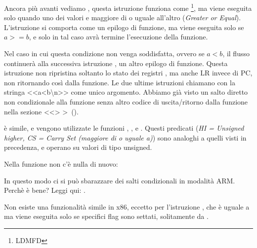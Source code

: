 
Ancora più avanti vediamo , questa istruzione funziona come \footnote{\ac{LDMFD}},
ma viene eseguita solo quando uno dei valori e maggiore di o uguale all'altro (\emph{Greater or Equal}).
L'istruzione  si comporta come un epilogo di funzione, ma viene eseguita solo se $a>=b$, e solo in tal caso avrà termine l'esecuzione della funzione.


Nel caso in cui questa condizione non venga soddisfatta, ovvero se $a<b$, il flusso continuerà alla successiva istruzione  , un altro epilogo di funzione. Questa istruzione non ripristina soltanto lo stato dei registri  , ma anche \ac{LR} invece di \ac{PC}, non ritornando così dalla funzione.
Le due ultime istruzioni chiamano \printf con la stringa <<a<b\textbackslash{}n>> come unico argomento.
Abbiamo già visto un salto diretto non condizionale alla funzione \printf senza altro codice di uscita/ritorno dalla funzione nella sezione <<\PrintfSeveralArgumentsSectionName> >~().

 è simile, e vengono utilizzate le funzioni , , e . Questi predicati (\emph{HI = Unsigned higher, CS = Carry Set (maggiore di o uguale a)}) sono analoghi a quelli visti in precedenza, e operano su valori di tipo unsigned.

Nella funzione \main non c'è nulla di nuovo:



In questo modo ci si può sbarazzare dei salti condizionali in modalità ARM.
Perchè è bene? Leggi qui: .


Non esiste una funzionalità simile in x86, eccetto per l'istruzione  , che è uguale a \MOV ma viene eseguita solo
se specifici flag sono settati, solitamente da \CMP.

\mysubparagraph{\OptimizingKeilVI (\ThumbMode)}



